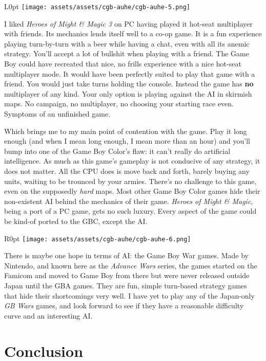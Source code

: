 \documentclass{book}
\begin{document}
\begin{wrapfigure}{L}{0pt} \texttt{[image: assets/assets/cgb-auhe/cgb-auhe-5.png]}\end{wrapfigure}
I liked \emph{Heroes of Might \& Magic 3} on PC having played it hot-seat multiplayer with friends. Its mechanics lends itself well to a co-op game. It is a fun experience playing turn-by-turn with a beer while having a chat, even with all its anemic strategy. You’ll accept a lot of bullshit when playing with a friend. The Game Boy could have recreated that nice, no frills experience with a nice hot-seat multiplayer mode. It would have been perfectly suited to play that game with a friend. You would just take turns holding the console. Instead the game has \textbf{no} multiplayer of any kind. Your only option is playing against the AI in skirmish maps. No campaign, no multiplayer, no choosing your starting race even. Symptoms of an unfinished game.

Which brings me to my main point of contention with the game. Play it long enough (and when I mean long enough, I mean more than an hour) and you’ll bump into one of the Game Boy Color’s flaw: it can’t really do artificial intelligence. As much as this game’s gameplay is not conducive of any strategy, it does not matter. All the CPU does is move back and forth, barely buying any units, waiting to be trounced by your armies. There’s no challenge to this game, even on the supposedly \emph{hard} maps. Most other Game Boy Color games hide their non-existent AI behind the mechanics of their game. \emph{Heroes of Might \& Magic}, being a port of a PC game, gets no such luxury. Every aspect of the game could be kind-of ported to the GBC, except the AI.

\begin{wrapfigure}{R}{0pt} \texttt{[image: assets/assets/cgb-auhe/cgb-auhe-6.png]}\end{wrapfigure}
There is maybe one hope in terms of AI: the Game Boy War games. Made by Nintendo, and known here as the \emph{Advance Wars} series, the games started on the Famicom and moved to Game Boy from there but were never released outside Japan until the GBA games. They are fun, simple turn-based strategy games that hide their shortcomings very well. I have yet to play any of the Japan-only \emph{GB Wars} games, and look forward to see if they have a reasonable difficulty curve and an interesting AI.

\FloatBarrier\needspace{10mm}\section*{Conclusion}\nopagebreak[4]
\end{document}
